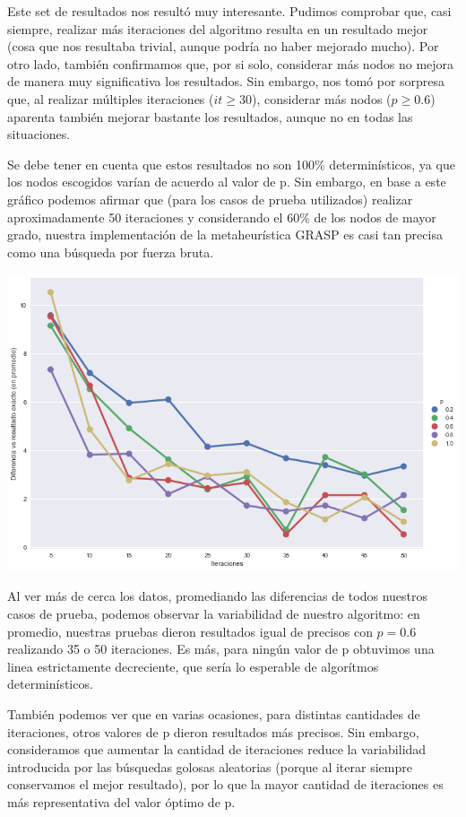 Este set de resultados nos resultó muy interesante. Pudimos comprobar que, casi siempre, realizar más iteraciones del algoritmo resulta en un resultado mejor (cosa que nos resultaba trivial, aunque podría no haber mejorado mucho). Por otro lado, también confirmamos que, por si solo, considerar más nodos no mejora de manera muy significativa los resultados. Sin embargo, nos tomó por sorpresa que, al realizar múltiples iteraciones ($it \geq 30$), considerar más nodos ($p \geq 0.6$) aparenta también mejorar bastante los resultados, aunque no en todas las situaciones.
 
Se debe tener en cuenta que estos resultados no son 100\% determinísticos, ya que los nodos escogidos varían de acuerdo al valor de p. Sin embargo, en base a este gráfico podemos afirmar que (para los casos de prueba utilizados) realizar aproximadamente 50 iteraciones y considerando el 60\% de los nodos de mayor grado, nuestra implementación de la metaheurística GRASP es casi tan precisa como una búsqueda por fuerza bruta.

\begin{center}
    \includegraphics[scale=0.6]{img/grasp-it-v-p.png}
\end{center}

Al ver más de cerca los datos, promediando las diferencias de todos nuestros casos de prueba, podemos observar la variabilidad de nuestro algoritmo: en promedio, nuestras pruebas dieron resultados igual de precisos con $p = 0.6$ realizando 35 o 50 iteraciones. Es más, para ningún valor de p obtuvimos una linea estrictamente decreciente, que sería lo esperable de algorítmos determinísticos.

También podemos ver que en varias ocasiones, para distintas cantidades de iteraciones, otros valores de p dieron resultados más precisos. Sin embargo, consideramos que aumentar la cantidad de iteraciones reduce la variabilidad introducida por las búsquedas golosas aleatorias (porque al iterar siempre conservamos el mejor resultado), por lo que la mayor cantidad de iteraciones es más representativa del valor óptimo de p.